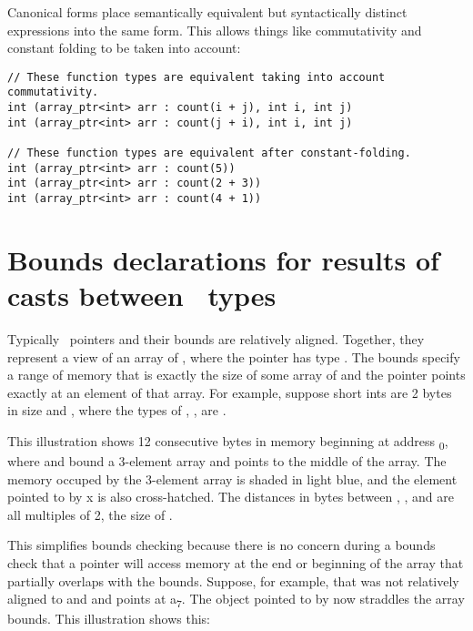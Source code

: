 Canonical forms place semantically equivalent but syntactically distinct
expressions into the same form.  This allows things like commutativity and constant
folding to be taken into account:
\begin{lstlisting}
// These function types are equivalent taking into account commutativity.
int (array_ptr<int> arr : count(i + j), int i, int j)
int (array_ptr<int> arr : count(j + i), int i, int j)

// These function types are equivalent after constant-folding.
int (array_ptr<int> arr : count(5))
int (array_ptr<int> arr : count(2 + 3))
int (array_ptr<int> arr : count(4 + 1))
\end{lstlisting}

\section{Bounds declarations for results of casts between \plainarrayptr\ types}
\label{section:pointer-cast-results}

Typically \arrayptr\ pointers and their bounds are relatively
aligned. Together, they represent a view of an array of , where
the pointer has type
\arrayptrT. The
bounds specify a range of memory that is exactly the size of some array
of  and the pointer points exactly at an element of that array. For
example, suppose short ints are 2 bytes in size and
{}, where the types of ,
,  are  .

This illustration shows 12 consecutive bytes in memory beginning at
address \textsubscript{0}, where  and  bound a
3-element array and  points to the middle of the array. The
memory occuped by the 3-element array is shaded in light blue, and the
element pointed to by x is also cross-hatched. The distances in bytes
between , , and  are all multiples of 2,
the size of .
\begin{center}
\end{center}

This simplifies bounds checking because there is no concern during a
bounds check that a pointer will access memory at the end or beginning
of the array that partially overlaps with the bounds. Suppose, for
example, that  was not relatively aligned to  and
 and points at a\textsubscript{7}. The object pointed to by
 now straddles the array bounds. This illustration shows this:
\begin{center}
\end{center}


